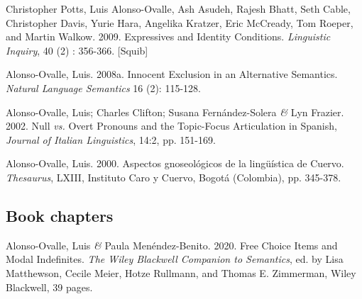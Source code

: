 \documentclass[11pt]{article}
\begin{document}
Christopher Potts, Luis Alonso-Ovalle, Ash Asudeh,
    Rajesh Bhatt, Seth Cable, Christopher Davis, Yurie Hara, Angelika
    Kratzer, Eric McCready, Tom Roeper, and Martin Walkow. 2009. 
  Expressives and Identity Conditions. \textit{Linguistic Inquiry}, 40
  (2) : 356-366. [Squib]

Alonso-Ovalle, Luis. 2008a. Innocent Exclusion in an
  Alternative Semantics. \textit{Natural Language Semantics} 16 (2):
  115-128. 


Alonso-Ovalle, Luis; Charles Clifton; Susana Fern\'andez-Solera \textit{\&} Lyn Frazier. 2002. Null \textit{vs.} Overt Pronouns and the Topic-Focus Articulation in Spanish, \textit{Journal of Italian Linguistics}, 14:2, pp. 151-169. 

Alonso-Ovalle, Luis. 2000. Aspectos gnoseol\'ogicos de la ling\"u\'istica de Cuervo. \textit{Thesaurus}, LXIII, Instituto Caro y Cuervo, Bogot\'a (Colombia), pp. 345-378. 



\subsection*{Book chapters} 

Alonso-Ovalle, Luis \textit{\&} Paula Men\'endez-Benito. 2020. Free Choice Items and Modal Indefinites. \textit{The Wiley Blackwell Companion to Semantics}, ed. by Lisa Matthewson, Cecile Meier, Hotze Rullmann, and Thomas E. Zimmerman, Wiley Blackwell, 39 pages. %
\end{document}
